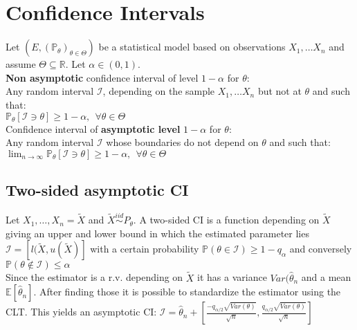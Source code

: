 \section{Confidence Intervals}

Let $\displaystyle ( E,(\mathbb{P}_{\theta })_{\theta \in \Theta })$ be a statistical  model based on observations $X_{1} , \ldots X_{n}$  and assume $\displaystyle \Theta \subseteq \mathbb{R}$. Let $\displaystyle \alpha \in ( 0,1)$.\\

\textbf{Non asymptotic} confidence interval of level $\displaystyle 1-\alpha $ for $\displaystyle \theta $:\\

Any random interval $\displaystyle \mathcal{I}$, depending on the sample $X_{1} , \ldots X_{n}$ but not at $\displaystyle \theta $ and such that:\\

$\mathbb{P}_{\theta }[\mathcal{I} \ni \theta ] \geq 1-\alpha ,\ \ \forall \theta \in \Theta$\\

Confidence interval of \textbf{asymptotic level} $\displaystyle 1-\alpha $  for $\displaystyle \theta $:\\

Any random interval $\displaystyle \mathcal{I}$ whose boundaries do not depend on $\displaystyle \theta $ and such that:\\

$\lim _{n\rightarrow \infty }\mathbb{P}_{\theta } [\mathcal{I} \ni \theta ]\geq 1-\alpha ,\ \ \forall \theta \in \Theta $\\

\subsection*{Two-sided asymptotic CI}
Let $X_1, \ldots, X_n = \tilde{X}$ and $\tilde{X}\stackrel{iid} {\sim} P_{\theta}$. A two-sided CI is a function depending on $\tilde{X}$ giving an upper and lower bound in which the estimated parameter lies $\mathcal{I} = [l(\tilde{X},u(\tilde{X})]$ with a certain probability $\mathbb{P}(\theta \in  \mathcal{I}) \geq 1 -q_{\alpha}$ and conversely $\mathbb{P}(\theta \not\in  \mathcal{I}) \leq \alpha$\\

Since the estimator is a r.v. depending on $\tilde{X}$ it has a variance $Var(\hat{\theta}_n$ and a mean $\mathbb{E}[\hat{\theta}_n]$. After finding those it is possible to standardize the estimator using the CLT. This yields an asymptotic CI: $\mathcal{I} = \hat{\theta}_n + [\frac{-q_{\alpha /2} \sqrt{Var(\theta)} }{\sqrt{n}}, \frac{q_{\alpha /2} \sqrt{Var(\theta)} }{\sqrt{n}}]$

